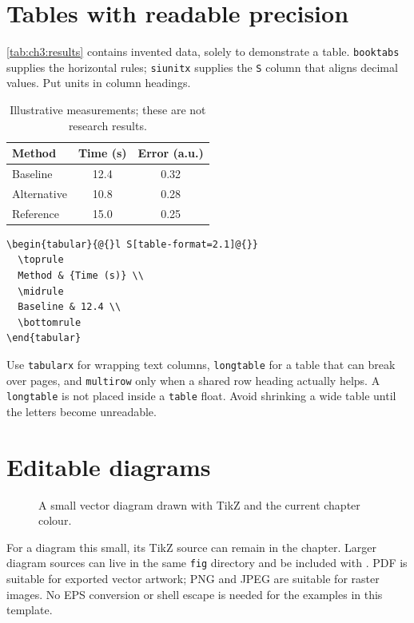 \section{Tables with readable precision}
\autoref{tab:ch3:results} contains invented data, solely to demonstrate a table.
\texttt{booktabs} supplies the horizontal rules; \texttt{siunitx} supplies the
\texttt{S} column that aligns decimal values. Put units in column headings.
\begin{table}[htbp]
\centering
\caption{Illustrative measurements; these are not research results.}
\label{tab:ch3:results}
\begin{tabular}{@{}l S[table-format=2.1] S[table-format=1.2]@{}}
\toprule
Method & {Time (s)} & {Error (a.u.)}\\\midrule
Baseline & 12.4 & 0.32\\
Alternative & 10.8 & 0.28\\
Reference & 15.0 & 0.25\\\bottomrule
\end{tabular}
\end{table}
\begin{lstlisting}
\begin{tabular}{@{}l S[table-format=2.1]@{}}
  \toprule
  Method & {Time (s)} \\
  \midrule
  Baseline & 12.4 \\
  \bottomrule
\end{tabular}
\end{lstlisting}
Use \texttt{tabularx} for wrapping text columns, \texttt{longtable} for a table
that can break over pages, and \texttt{multirow} only when a shared row heading
actually helps. A \texttt{longtable} is not placed inside a \texttt{table} float.
Avoid shrinking a wide table until the letters become unreadable.

\section{Editable diagrams}
\begin{figure}[htbp]
\centering
{}
\caption{A small vector diagram drawn with TikZ and the current chapter colour.}
\label{fig:ch3:workflow}
\end{figure}
For a diagram this small, its TikZ source can remain in the chapter. Larger
diagram sources can live in the same \texttt{fig} directory and be included
with \verb||. PDF is suitable for exported
vector artwork; PNG and JPEG are suitable for raster images. No EPS conversion
or shell escape is needed for the examples in this template.

